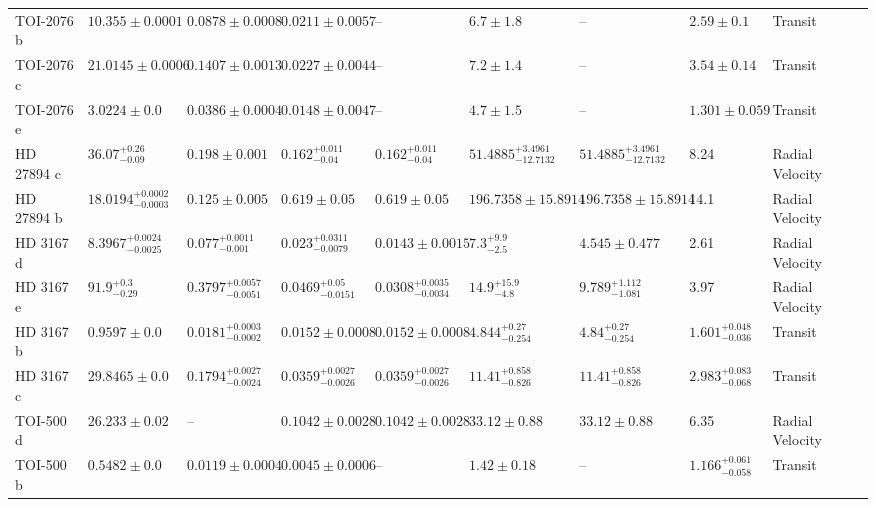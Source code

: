 \begin{tabular}{llllllllll}
TOI-2076 b & $10.355 \pm 0.0001$ & $0.0878 \pm 0.0008$ & $0.0211 \pm 0.0057$ & -- & $6.7 \pm 1.8$ & -- & $2.59 \pm 0.1$ & Transit & \cite{WANG_ET_AL_2026} \\
TOI-2076 c & $21.0145 \pm 0.0006$ & $0.1407 \pm 0.0013$ & $0.0227 \pm 0.0044$ & -- & $7.2 \pm 1.4$ & -- & $3.54 \pm 0.14$ & Transit & \cite{WANG_ET_AL_2026} \\
TOI-2076 e & $3.0224 \pm 0.0$ & $0.0386 \pm 0.0004$ & $0.0148 \pm 0.0047$ & -- & $4.7 \pm 1.5$ & -- & $1.301 \pm 0.059$ & Transit & \cite{WANG_ET_AL_2026} \\
HD 27894 c & $36.07^{+0.26}_{-0.09}$ & $0.198 \pm 0.001$ & $0.162^{+0.011}_{-0.04}$ & $0.162^{+0.011}_{-0.04}$ & $51.4885^{+3.4961}_{-12.7132}$ & $51.4885^{+3.4961}_{-12.7132}$ & 8.24 & Radial Velocity & \cite{TRIFONOV_ET_AL__2017} \\
HD 27894 b & $18.0194^{+0.0002}_{-0.0003}$ & $0.125 \pm 0.005$ & $0.619 \pm 0.05$ & $0.619 \pm 0.05$ & $196.7358 \pm 15.8914$ & $196.7358 \pm 15.8914$ & 14.1 & Radial Velocity & \cite{FENG_ET_AL__2022} \\
HD 3167 d & $8.3967^{+0.0024}_{-0.0025}$ & $0.077^{+0.0011}_{-0.001}$ & $0.023^{+0.0311}_{-0.0079}$ & $0.0143 \pm 0.0015$ & $7.3^{+9.9}_{-2.5}$ & $4.545 \pm 0.477$ & 2.61 & Radial Velocity & \cite{COY_ET_AL_2026} \\
HD 3167 e & $91.9^{+0.3}_{-0.29}$ & $0.3797^{+0.0057}_{-0.0051}$ & $0.0469^{+0.05}_{-0.0151}$ & $0.0308^{+0.0035}_{-0.0034}$ & $14.9^{+15.9}_{-4.8}$ & $9.789^{+1.112}_{-1.081}$ & 3.97 & Radial Velocity & \cite{COY_ET_AL_2026} \\
HD 3167 b & $0.9597 \pm 0.0$ & $0.0181^{+0.0003}_{-0.0002}$ & $0.0152 \pm 0.0008$ & $0.0152 \pm 0.0008$ & $4.844^{+0.27}_{-0.254}$ & $4.84^{+0.27}_{-0.254}$ & $1.601^{+0.048}_{-0.036}$ & Transit & \cite{COY_ET_AL_2026} \\
HD 3167 c & $29.8465 \pm 0.0$ & $0.1794^{+0.0027}_{-0.0024}$ & $0.0359^{+0.0027}_{-0.0026}$ & $0.0359^{+0.0027}_{-0.0026}$ & $11.41^{+0.858}_{-0.826}$ & $11.41^{+0.858}_{-0.826}$ & $2.983^{+0.083}_{-0.068}$ & Transit & \cite{COY_ET_AL_2026} \\
TOI-500 d & $26.233 \pm 0.02$ & -- & $0.1042 \pm 0.0028$ & $0.1042 \pm 0.0028$ & $33.12 \pm 0.88$ & $33.12 \pm 0.88$ & 6.35 & Radial Velocity & \cite{SERRANO_ET_AL_2022} \\
TOI-500 b & $0.5482 \pm 0.0$ & $0.0119 \pm 0.0004$ & $0.0045 \pm 0.0006$ & -- & $1.42 \pm 0.18$ & -- & $1.166^{+0.061}_{-0.058}$ & Transit & \cite{SERRANO_ET_AL_2022} \\

\end{tabular}
